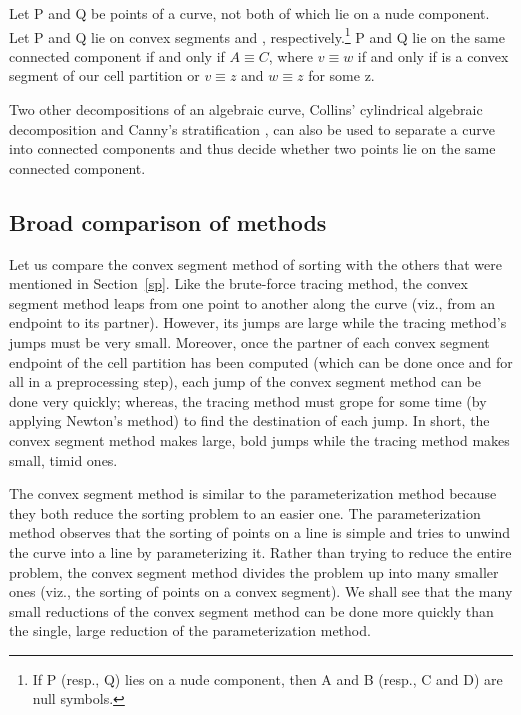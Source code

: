 \begin{lemma}
Let P and Q be points of a curve, not both of which lie on a nude component.
Let P and Q lie on convex segments  and , respectively.\footnote{If 
	P (resp., Q) lies on a nude component, then A and B (resp., C and D) are
	null symbols.}
P and Q lie on the same connected component if and only if $A \equiv C$, where
$v \equiv w$ if and only if  is a convex segment of our cell partition 
or $v \equiv z$ and $w \equiv z$ for some z.
\end{lemma}

\noindent Two other decompositions of an algebraic curve, Collins' cylindrical algebraic 
decomposition \cite{Co75,arnon83} and Canny's stratification \cite{Ca}, 
can also be used to separate a curve into connected components and thus decide whether
two points lie on the same connected component.

\subsection{Broad comparison of methods}

Let us compare the convex segment method of sorting with the others that were mentioned in
Section~\ref{sp}.
Like the brute-force tracing method, the convex segment method leaps from one 
point to another along the curve (viz., from an endpoint to its partner).
However, its jumps are large while the tracing method's jumps must be very small.
Moreover, once the partner of each convex segment endpoint of the cell partition has
been computed (which can be done once and for all in a preprocessing step),
each jump of the convex segment method can be done very quickly; whereas, the tracing
method must grope for some time (by applying Newton's method) to find the destination 
of each jump.
In short, the convex segment method 
makes large, bold jumps while the tracing method makes small, timid ones.

The convex segment method is similar to the parameterization method because
they both reduce the sorting problem to an easier one.
The parameterization method observes that the sorting of points 
on a line is simple and tries to unwind the curve into a line by parameterizing it.
Rather than trying to reduce the entire problem, the convex segment method divides 
the problem up into many smaller ones (viz., the sorting of points on a convex 
segment).
We shall see that the many small reductions of the convex segment method
can be done more quickly than the single, large reduction of
the parameterization method.

